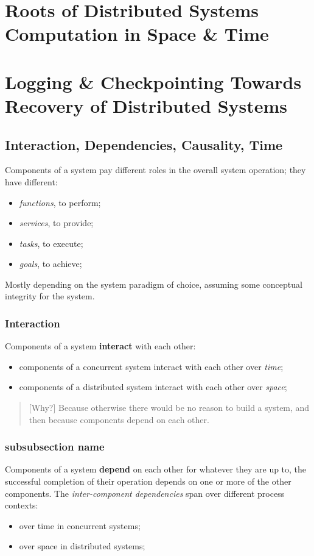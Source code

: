 \documentclass[11pt, a4paper]{article}
\begin{document}
\section{Roots of Distributed Systems Computation in Space \& Time}\label{sec:roots_of_distributed_systems_computation_in_space_time} %
%
%
\section{Logging \& Checkpointing Towards Recovery of Distributed Systems}\label{sec:logging_checkpointing_towards_recovery_of_distributed_systems} %
%
\subsection{Interaction, Dependencies, Causality, Time}\label{sub:interaction_dependencies_causality_time} %
Components of a system pay different roles in the overall system operation; they have different:
\begin{itemize}
    \item \textit{functions}, to perform;
    \item \textit{services}, to provide;
    \item \textit{tasks}, to execute;
    \item \textit{goals}, to achieve;
\end{itemize}
Mostly depending on the system paradigm of choice, assuming some conceptual integrity for the system.
\subsubsection{Interaction}\label{sec:interaction} %
Components of a system \textbf{interact} with each other:
\begin{itemize}
    \item components of a concurrent system interact with each other over \textit{time};
    \item components of a distributed system interact with each other over \textit{space};
\end{itemize}
\begin{quote}[Why?]
    Because otherwise there would be no reason to build a system, and then because components depend on each other.
\end{quote}
%
\subsubsection{subsubsection name}\label{sec:subsubsection_name} %
Components of a system \textbf{depend} on each other for whatever they are up to, the successful completion of their operation depends on one or more of the other components.
The \textit{inter-component dependencies} span over different process contexts:
\begin{itemize}
    \item over time in concurrent systems;
    \item over space in distributed systems;
\end{itemize}
%
\end{document}
